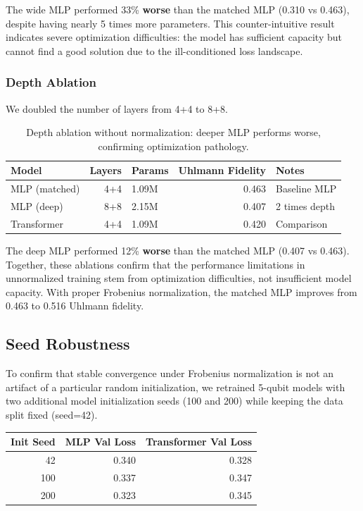 \documentclass[11pt]{article}
\begin{document}
The wide MLP performed 33\% \textbf{worse} than the matched MLP (0.310 vs 0.463), despite having nearly 5 times more parameters. This counter-intuitive result indicates severe optimization difficulties: the model has sufficient capacity but cannot find a good solution due to the ill-conditioned loss landscape.

\subsubsection{Depth Ablation}
\label{sec:orgd8f102b}

We doubled the number of layers from 4+4 to 8+8.

\begin{table}[htbp]
\caption{\label{tab:orga01228b}Depth ablation without normalization: deeper MLP performs worse, confirming optimization pathology.}
\centering
\begin{tabular}{lrlrl}
Model & Layers & Params & Uhlmann Fidelity & Notes\\[0pt]
\hline
MLP (matched) & 4+4 & 1.09M & 0.463 & Baseline MLP\\[0pt]
MLP (deep) & 8+8 & 2.15M & 0.407 & 2 times depth\\[0pt]
Transformer & 4+4 & 1.09M & 0.420 & Comparison\\[0pt]
\end{tabular}
\end{table}

The deep MLP performed 12\% \textbf{worse} than the matched MLP (0.407 vs 0.463). Together, these ablations confirm that the performance limitations in unnormalized training stem from optimization difficulties, not insufficient model capacity. With proper Frobenius normalization, the matched MLP improves from 0.463 to 0.516 Uhlmann fidelity.

\subsection{Seed Robustness}
\label{sec:org373f4c3}
To confirm that stable convergence under Frobenius normalization is not an artifact of a particular random initialization, we retrained 5-qubit models with two additional model initialization seeds (100 and 200) while keeping the data split fixed (seed=42).

\begin{center}
\begin{tabular}{rrr}
Init Seed & MLP Val Loss & Transformer Val Loss\\[0pt]
\hline
42 & 0.340 & 0.328\\[0pt]
100 & 0.337 & 0.347\\[0pt]
200 & 0.323 & 0.345\\[0pt]
\end{tabular}
\end{center}
\end{document}
